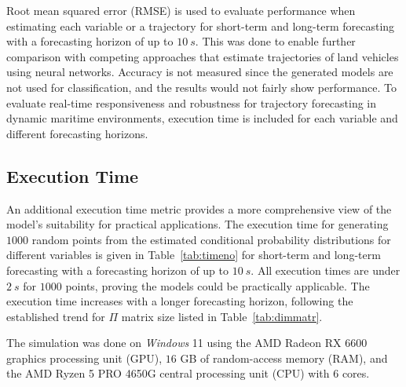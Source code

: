 \documentclass[preprint,12pt]{elsarticle}
\begin{document}
Root mean squared error (RMSE) is used to evaluate performance when estimating each variable or a trajectory for short-term and long-term forecasting with a forecasting horizon of up to $10 \ s$. This was done to enable further comparison with competing approaches that estimate trajectories of land vehicles using neural networks. Accuracy is not measured since the generated models are not used for classification, and the results would not fairly show performance. To evaluate real-time responsiveness and robustness for trajectory forecasting in dynamic maritime environments, execution time is included for each variable and different forecasting horizons.

\subsection{Execution Time}

An additional execution time metric provides a more comprehensive view of the model's suitability for practical applications. The execution time for generating $1000$ random points from the estimated conditional probability distributions for different variables is given in Table~\ref{tab:timeno} for short-term and long-term forecasting with a forecasting horizon of up to $10 \ s$. All execution times are under $2 \ s$ for $1000$ points, proving the models could be practically applicable. The execution time increases with a longer forecasting horizon, following the established trend for $\Pi$ matrix size listed in Table~\ref{tab:dimmatr}.

The simulation was done on \textit{Windows} 11 using the AMD Radeon RX 6600 graphics processing unit (GPU), $16$ GB of random-access memory (RAM), and the AMD Ryzen 5 PRO 4650G central processing unit (CPU) with $6$ cores.
\end{document}
